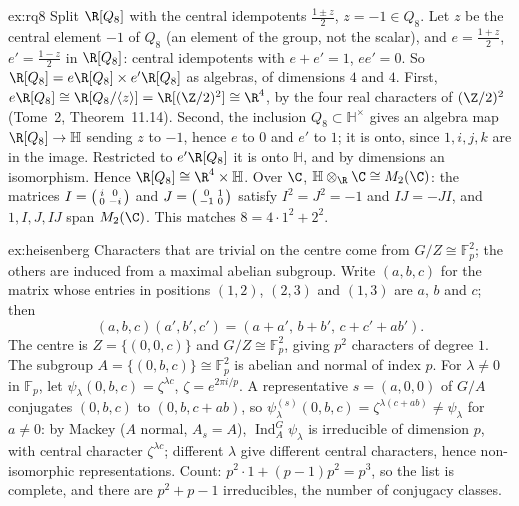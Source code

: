 \begin{solution}{ex:rq8}
\idea Split $\R[Q_8]$ with the central idempotents $\frac{1\pm z}2$, $z=-1\in Q_8$.
\writeup Let $z$ be the central element $-1$ of $Q_8$ (an element of the group, not the scalar), and $e=\frac{1+z}2$, $e'=\frac{1-z}2$ in $\R[Q_8]$: central idempotents with $e+e'=1$, $ee'=0$. So $\R[Q_8]=e\R[Q_8]\times e'\R[Q_8]$ as
algebras, of dimensions $4$ and $4$. First, $e\R[Q_8]\cong\R[Q_8/\langle z\rangle]=\R[(\Z/2)^2]\cong\R^4$, by the four real characters of $(\Z/2)^2$ (Tome~2, Theorem~11.14). Second, the inclusion $Q_8\subset\mathbb H^\times$ gives an algebra map
$\R[Q_8]\to\mathbb H$ sending $z$ to $-1$, hence $e$ to $0$ and $e'$ to $1$; it is onto, since $1,i,j,k$ are in the image. Restricted to $e'\R[Q_8]$ it is onto $\mathbb H$, and by dimensions an isomorphism. Hence $\R[Q_8]\cong\R^4\times\mathbb H$.
Over $\C$, $\mathbb H\otimes_\R\C\cong M_2(\C)$: the matrices $I=\begin{psmallmatrix}i&0\\0&-i\end{psmallmatrix}$ and $J=\begin{psmallmatrix}0&1\\-1&0\end{psmallmatrix}$ satisfy $I^2=J^2=-1$ and $IJ=-JI$, and $1,I,J,IJ$ span $M_2(\C)$. This matches
$8=4\cdot1^2+2^2$.
\end{solution}

\begin{solution}{ex:heisenberg}
\idea Characters that are trivial on the centre come from $G/Z\cong\mathbb F_p^2$; the others are induced from a maximal abelian subgroup.
\writeup Write $(a,b,c)$ for the matrix whose entries in positions $(1,2)$, $(2,3)$ and $(1,3)$ are $a$, $b$ and $c$; then
\[
(a,b,c)(a',b',c')=(a+a',\,b+b',\,c+c'+ab').
\] The centre is $Z=\{(0,0,c)\}$ and $G/Z\cong\mathbb F_p^2$, giving $p^2$ characters of degree $1$.
The subgroup $A=\{(0,b,c)\}\cong\mathbb F_p^2$ is abelian and normal of index $p$. For $\lambda\ne0$ in $\mathbb F_p$, let $\psi_\lambda(0,b,c)=\zeta^{\lambda c}$, $\zeta=e^{2\pi i/p}$. A representative $s=(a,0,0)$ of $G/A$ conjugates $(0,b,c)$ to $(0,b,c+ab)$, so
$\psi_\lambda^{(s)}(0,b,c)=\zeta^{\lambda(c+ab)}\ne\psi_\lambda$ for $a\ne0$: by Mackey ($A$ normal, $A_s=A$), $\operatorname{Ind}_A^G\psi_\lambda$ is irreducible of dimension $p$, with central character $\zeta^{\lambda c}$; different $\lambda$ give
different central characters, hence non-isomorphic representations. Count: $p^2\cdot1+(p-1)p^2=p^3$, so the list is complete, and there are $p^2+p-1$ irreducibles, the number of conjugacy classes.
\end{solution}

